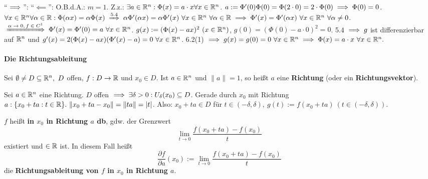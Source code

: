 \documentclass[a4paper,twoside,DIV15,BCOR12mm,chapterprefix=true,headings=twolinechapter]{scrbook}
\begin{document}
\begin{beweis}
``$\implies$'':
``$\impliedby$'': O.B.d.A.: $m=1$. Z.z.: $\exists a \in \mathbb{R}^n:\Phi(x)=a\cdot x \forall x \in \mathbb{R}^n$.
$a:=\Phi'(0) \Phi(0)=\Phi(2\cdot0)=2\cdot \Phi(0) \implies \Phi(0)=0$.
$\forall x \in \MdR^n \forall \alpha \in \MdR: \Phi(\alpha x)=\alpha\Phi(x) \folgtnach{5.4} \alpha \Phi'(\alpha x)=\alpha\Phi'(x)\ \forall x \in \MdR^n\ \forall \alpha \in \MdR
\folgt \Phi'(x)=\Phi'(\alpha x)\ \forall x \in\MdR^n\ \forall\alpha\ne0$.$ \folgtnach{$\alpha\to0, f\in C^1$} \Phi'(x)=\Phi'(0)=a\ \forall x \in\MdR^n$.
$g(x):=(\Phi(x)-ax)^2\ (x \in \mathbb{R}^n)$, $ g(0)=(\Phi(0)-a\cdot0)^2=0$.
5.4 $\implies g$ ist differenzierbar auf $\mathbb{R}^n$ und $g'(x)=2(\Phi(x)-ax)(\Phi'(x)-a)=0\ \forall x \in \mathbb{R}^n$.
6.2(1) $\folgt g(x)=g(0)=0\ \forall x\in\MdR^n \folgt \Phi(x)=a\cdot x\ \forall x \in \MdR^n.$
\end{beweis}

\paragraph{Die Richtungsableitung}
Sei $\emptyset \ne D \subseteq \MdR^n,\ D$ offen, $f:D \to \mathbb{R}$ und $x_0 \in D$. Ist $a \in \mathbb{R}^n$ und $\|a\|=1$, so heißt $a$ eine \textbf{Richtung} (oder ein \textbf{Richtungsvektor}).

Sei $a \in \mathbb{R}^n$ eine Richtung. $D$ offen $\implies \exists \delta>0: U_\delta(x_0) \subseteq D$. Gerade durch $x_0$ mit Richtung $a:\{x_0+ta:t\in\mathbb{R}\}.\  \|x_0+ta-x_0\| = \|ta\| = |t|$. Also: $x_0+ta \in D$ für $t \in (-\delta,\delta),\ g(t) := f(x_0+ta)\ (t \in (-\delta,\delta))$.

$f$ heißt \textbf{in $x_0$ in Richtung $a$ db}, gdw. der Grenzwert $$\lim_{t\to 0} \frac{f(x_0+ta)-f(x_0)}{t}$$ existiert und $\in \mathbb{R}$ ist. In diesem Fall heißt $$\frac{\partial f}{\partial a}(x_0) := \lim_{t\to 0} \frac{f(x_0+ta)-f(x_0)}{t}$$ die \textbf{Richtungsableitung von $f$ in $x_0$ in Richtung $a$}.
\end{document}
